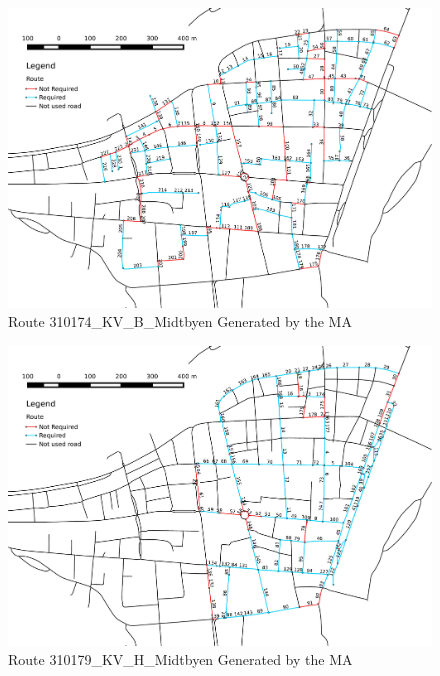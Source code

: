 \begin{landscape}
\begin{figure}[thbp]
    \centerline{\includegraphics[height=0.945\textwidth]{figures/Routes/Drawn/Rute_KV_B_Generert_Proper_Run.pdf}}
    \caption{Route 310174\_KV\_B\_Midtbyen Generated by the MA}
    \label{fig:KV_B_drawn}
\end{figure}
\end{landscape}

\begin{landscape}
\begin{figure}[thbp]
    \centerline{\includegraphics[height=0.945\textwidth]{figures/Routes/Drawn/Rute_KV_H_Generert_Proper_Run.pdf}}
    \caption{Route 310179\_KV\_H\_Midtbyen Generated by the MA}
    \label{fig:KV_H_drawn}
\end{figure}
\end{landscape}

